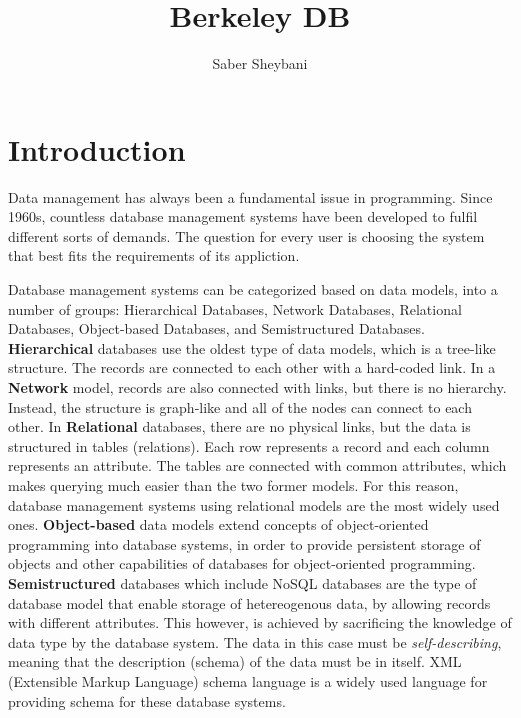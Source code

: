 \documentclass[9pt,twocolumn,twoside]{../../styles/osajnl}
\title{Berkeley DB}
\author[1,*]{Saber Sheybani}
\affil[1]{School of Informatics and Computing, Bloomington, IN 47408, U.S.A.}
\affil[*]{Corresponding authors: sheybani@indiana.edu}
\begin{document}
\maketitle

\section{Introduction}

Data management has always been a fundamental issue in programming.
Since 1960s, countless database management systems have been developed 
to fulfil different sorts of demands. The question for every user is choosing the 
system that best fits the requirements of its appliction.

Database management systems can be categorized based on data models, into a 
number of groups: Hierarchical Databases, Network Databases, Relational Databases, Object-based Databases, and Semistructured Databases.
\newline 
\textbf{Hierarchical} databases use the oldest type of data models, which is a tree-like structure. 
The records are connected to each other with a hard-coded link.
\newline 
In a \textbf{Network} model, records are also connected with links, but there is no hierarchy. Instead, the structure is graph-like
and all of the nodes can connect to each other.
\newline 
In \textbf{Relational} databases, there are no physical links, but the data is structured 
in tables (relations). Each row represents a record and each column represents an attribute. 
The tables are connected with common attributes, which makes querying
much easier than the two former models. For this reason, database management systems
using relational models are the most widely used ones.
\newline 
\textbf{Object-based} data models extend concepts of object-oriented programming into database systems, 
in order to provide persistent storage of objects and other capabilities of databases
for object-oriented programming.
\newline
\textbf{Semistructured} databases which include NoSQL databases are the type of database model
that enable storage of hetereogenous data, by allowing records with different attributes.
This however, is achieved by sacrificing the knowledge of data type by the database system.
The data in this case must be \textit{self-describing}, meaning that the description (schema) of the
data must be in itself. XML (Extensible Markup Language) schema language is a widely used language
for providing schema for these database systems\cite{limited2010introduction}.  
\end{document}
